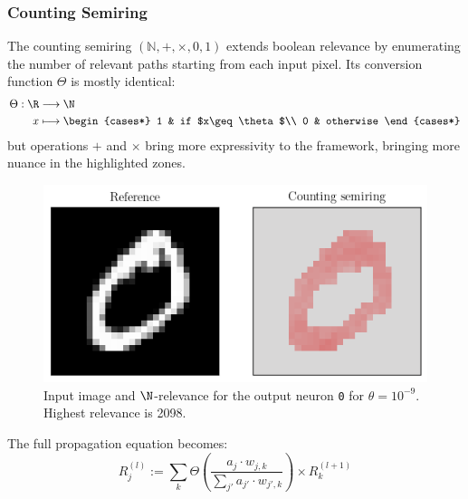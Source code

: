 \documentclass{../cs-classes/cs-classes}
\newcommand*{\1}{\digitsbb{1}}
\newcommand*{\0}{\digitsbb{0}}
\begin{document}
\subsubsection{Counting Semiring}
The counting semiring $(\mathbb{N}, +, \times, 0, 1)$ extends boolean relevance by enumerating the number of relevant paths starting from each input pixel. Its conversion function $\Theta$ is mostly identical:
\begin{equation}
    \begin{aligned}
        \Theta: \R&\longrightarrow\N\\
        x&\longmapsto \begin{cases*}
            1 & if $x\geq\theta$\\
            0 & otherwise
        \end{cases*}
    \end{aligned}
\end{equation}
but operations $+$ and $\times$ bring more expressivity to the framework, bringing more nuance in the highlighted zones.

\begin{figure}[H]
    \centering
    \includegraphics[width=.5\textwidth]{counting.png}
    \caption{Input image and $\N$-relevance for the output neuron \texttt{0} for $\theta=10^{-9}$.\\ Highest relevance is 2098.}
\end{figure}

The full propagation equation becomes:
\begin{equation}
    R^{(l)}_j := \sum_{k}\Theta\left(\frac{a_j\cdot w_{j, k}}{\sum_{j'}a_{j'}\cdot w_{j', k}}\right) \times R^{(l+1)}_k
    \label{eq:counting-lrp}
\end{equation}
\end{document}
